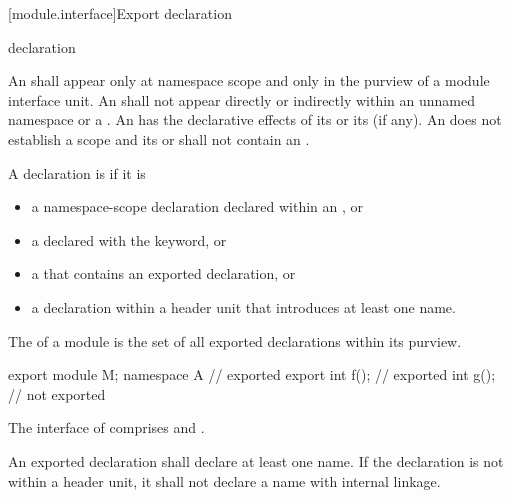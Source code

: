 [module.interface]{Export declaration}%

\begin{bnf}
\br
     declaration\br
     \terminal{\{}  \terminal{\}}
\end{bnf}

\pnum
An  shall appear only
at namespace scope and only in the purview of a module interface unit.
An  shall not appear directly
or indirectly within an unnamed namespace
or a .
An 
has the declarative effects of its 
or its  (if any).
An  does not
establish a scope and its 
or 
shall not contain an .

\pnum
A declaration is  if it is
\begin{itemize}
\item a namespace-scope declaration declared within an
      , or
\item a  declared with
      the  keyword, or
\item a  that contains an
      exported declaration, or
\item a declaration within a header unit
      that introduces at least one name.
\end{itemize}
The  of a module 
is the set of all exported declarations within its purview.
\begin{example}
\begin{codeblock}
export module M;
namespace A {                   // exported
  export int f();               // exported
  int g();                      // not exported
}
\end{codeblock}
The interface of  comprises  and .
\end{example}

\pnum
An exported declaration shall declare at least one name.
If the declaration is not within a header unit,
it shall not declare a name with internal linkage.


